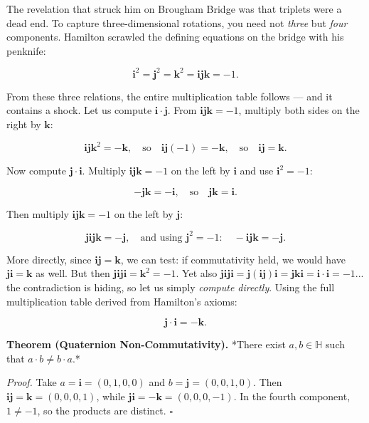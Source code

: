 \documentclass[11pt,openany]{book}
\theoremstyle{definition}
\theoremstyle{plain}
\theoremstyle{remark}
\begin{document}
The revelation that struck him on Brougham Bridge was that triplets were a dead end. To capture three-dimensional rotations, you need not \textit{three} but \textit{four} components. Hamilton scrawled the defining equations on the bridge with his penknife:

$$\mathbf{i}^2 = \mathbf{j}^2 = \mathbf{k}^2 = \mathbf{i}\mathbf{j}\mathbf{k} = -1.$$

From these three relations, the entire multiplication table follows — and it contains a shock. Let us compute $\mathbf{i} \cdot \mathbf{j}$. From $\mathbf{i}\mathbf{j}\mathbf{k} = -1$, multiply both sides on the right by $\mathbf{k}$:

$$\mathbf{i}\mathbf{j}\mathbf{k}^2 = -\mathbf{k}, \quad \text{so} \quad \mathbf{i}\mathbf{j}(-1) = -\mathbf{k}, \quad \text{so} \quad \mathbf{i}\mathbf{j} = \mathbf{k}.$$

Now compute $\mathbf{j} \cdot \mathbf{i}$. Multiply $\mathbf{i}\mathbf{j}\mathbf{k} = -1$ on the left by $\mathbf{i}$ and use $\mathbf{i}^2 = -1$:

$$-\mathbf{j}\mathbf{k} = -\mathbf{i}, \quad \text{so} \quad \mathbf{j}\mathbf{k} = \mathbf{i}.$$

Then multiply $\mathbf{i}\mathbf{j}\mathbf{k} = -1$ on the left by $\mathbf{j}$:

$$\mathbf{j}\mathbf{i}\mathbf{j}\mathbf{k} = -\mathbf{j}, \quad \text{and using } \mathbf{j}^2 = -1: \quad -\mathbf{i}\mathbf{j}\mathbf{k} = -\mathbf{j}.$$

More directly, since $\mathbf{i}\mathbf{j} = \mathbf{k}$, we can test: if commutativity held, we would have $\mathbf{j}\mathbf{i} = \mathbf{k}$ as well. But then $\mathbf{j}\mathbf{i}\mathbf{j}\mathbf{i} = \mathbf{k}^2 = -1$. Yet also $\mathbf{j}\mathbf{i}\mathbf{j}\mathbf{i} = \mathbf{j}(\mathbf{i}\mathbf{j})\mathbf{i} = \mathbf{j}\mathbf{k}\mathbf{i} = \mathbf{i} \cdot \mathbf{i} = -1$... the contradiction is hiding, so let us simply \textit{compute directly}. Using the full multiplication table derived from Hamilton's axioms:

$$\mathbf{j} \cdot \mathbf{i} = -\mathbf{k}.$$

\textbf{Theorem (Quaternion Non-Commutativity).} *There exist $a, b \in \mathbb{H}$ such that $a \cdot b \neq b \cdot a$.*

\textit{Proof.} Take $a = \mathbf{i} = (0, 1, 0, 0)$ and $b = \mathbf{j} = (0, 0, 1, 0)$. Then $\mathbf{i}\mathbf{j} = \mathbf{k} = (0, 0, 0, 1)$, while $\mathbf{j}\mathbf{i} = -\mathbf{k} = (0, 0, 0, -1)$. In the fourth component, $1 \neq -1$, so the products are distinct. \(\square\)
\end{document}
